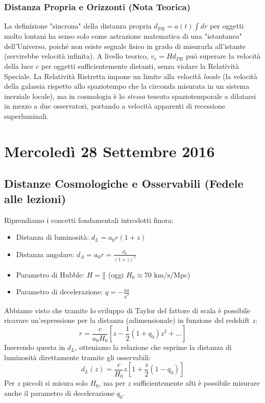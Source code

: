 \documentclass[11pt,a4paper]{report}
\begin{document}
\subsection{Distanza Propria e Orizzonti (Nota Teorica)}
La definizione "sincrona" della distanza propria $d_{PR} = a(t) \int dr$ per oggetti molto lontani ha senso solo come astrazione matematica di una "istantanea" dell'Universo, poiché non esiste segnale fisico in grado di misurarla all'istante (servirebbe velocità infinita). 
A livello teorico, $v_r = H d_{PR}$ può superare la velocità della luce $c$ per oggetti sufficientemente distanti, senza violare la Relatività Speciale. La Relatività Ristretta impone un limite alla velocità \textit{locale} (la velocità della galassia rispetto allo spaziotempo che la circonda misurata in un sistema inerziale locale), ma in cosmologia è lo \textit{stesso} tessuto spaziotemporale a dilatarsi in mezzo a due osservatori, portando a velocità apparenti di recessione superluminali.

\chapter{ Mercoledì 28 Settembre 2016}

\section{Distanze Cosmologiche e Osservabili (Fedele alle lezioni)}

Riprendiamo i concetti fondamentali introdotti finora:
\begin{itemize}
    \item Distanza di luminosità: $d_L = a_0 r (1+z)$
    \item Distanza angolare: $d_A = a_0 r = \frac{d_L}{(1+z)^2}$
    \item Parametro di Hubble: $H = \frac{\dot{a}}{a}$ (oggi $H_0 \approx 70 \text{ km/s/Mpc}$)
    \item Parametro di decelerazione: $q = -\frac{\ddot{a}a}{\dot{a}^2}$
\end{itemize}

Abbiamo visto che tramite lo sviluppo di Taylor del fattore di scala è possibile ricavare un'espressione per la distanza (adimensionale) in funzione del redshift $z$:
\begin{equation}
r = \frac{c}{a_0 H_0} \left[ z - \frac{1}{2}(1+q_0)z^2 + \dots \right]
\end{equation}
Inserendo questa in $d_L$, otteniamo la relazione che esprime la distanza di luminosità direttamente tramite gli osservabili:
\begin{equation}
d_L(z) = \frac{c}{H_0} z \left[ 1 + \frac{z}{2}(1-q_0) \right]
\end{equation}
Per $z$ piccoli si misura solo $H_0$, ma per $z$ sufficientemente alti è possibile misurare anche il parametro di decelerazione $q_0$.
\end{document}
